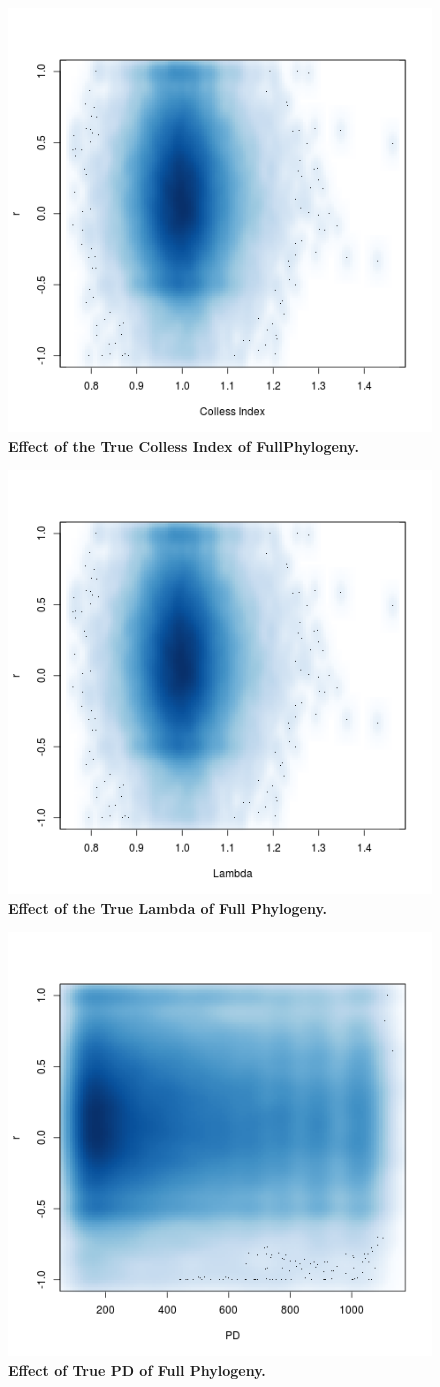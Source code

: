 \documentclass[12pt,english]{article}
\begin{document}
\begin{figure}[!ht]
  \center
  \includegraphics[width=.5\textwidth]{trueColless.png}
  \caption{\textbf{Effect of the True Colless Index of FullPhylogeny.}}
\end{figure}

\begin{figure}[!ht]
  \center
  \includegraphics[width=.5\textwidth]{trueLambda.png}
  \caption{\textbf{Effect of the True Lambda of Full Phylogeny.}}
\end{figure}

\begin{figure}[!ht]
  \center
  \includegraphics[width=.5\textwidth]{PD.png}
  \caption{\textbf{Effect of True PD of Full Phylogeny.}}
\end{figure}
\end{document}
